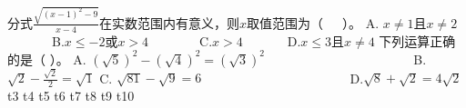 \markdownRendererDocumentBegin
\markdownRendererOlBeginTight
{}分式$\frac{\sqrt{(x-1)^2-9}}{x-4}$在实数范围内有意义，则$x$取值范围为（~~~）。\markdownRendererOlItemEnd 
\markdownRendererOlEndTight \markdownRendererInterblockSeparator
{}A. $x\neq 1$且$x\neq 2$~~~~~~~B.$x\le-2$或$x>4$~~~~~~~~C.$x>4$~~~~~~~D.$x\le3$且$x\neq4$\markdownRendererInterblockSeparator
{}\markdownRendererOlBeginTight
{}下列运算正确的是（ ）。\markdownRendererOlItemEnd 
\markdownRendererOlEndTight \markdownRendererInterblockSeparator
{}A. $(\sqrt{5})^2-(\sqrt{4})^2=(\sqrt{3})^2$ ~~~~~~~~~~~~~~~~~~~~~~ B.$\sqrt{2}-\frac{\sqrt{2}}{2}=\sqrt{1}$\markdownRendererInterblockSeparator
{}C. $\sqrt{81}-\sqrt{9}=6$ ~~~~~~~~~~~~~~~~~~~~~~ D.$\sqrt{8}+\sqrt{2}=4\sqrt{2}$\markdownRendererInterblockSeparator
{}\markdownRendererOlBeginTight
{}t3\markdownRendererOlItemEnd 
{}t4\markdownRendererOlItemEnd 
{}t5\markdownRendererOlItemEnd 
{}t6\markdownRendererOlItemEnd 
{}t7\markdownRendererOlItemEnd 
{}t8\markdownRendererOlItemEnd 
{}t9\markdownRendererOlItemEnd 
{}t10\markdownRendererOlItemEnd 
\markdownRendererOlEndTight \markdownRendererDocumentEnd
